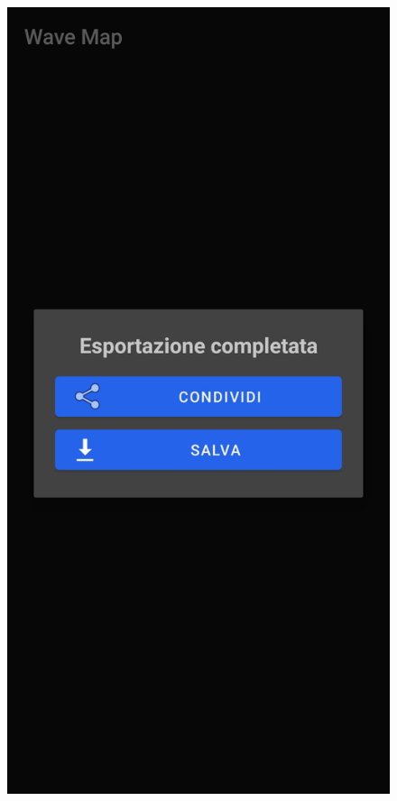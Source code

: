 \documentclass{beamer}
\begin{document}
\begin{frame}
\begin{figure}[H]
\begin{minipage}[b]{0.25\textwidth}
        \end{minipage}
        \begin{minipage}[b]{0.25\textwidth}
          \includegraphics[width=\textwidth]{./img/overview/export2.jpg}

\end{minipage}
\end{figure}
\end{frame}
\end{document}
